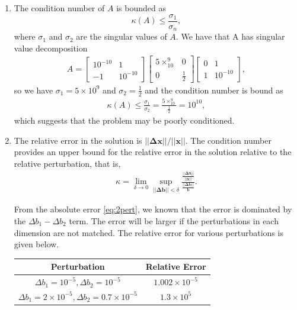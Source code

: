 \documentclass[10pt]{article}
\renewcommand\vec{\mathbf}
\begin{document}
\begin{enumerate}
\begin{enumerate}
      \item The condition number of \(A\) is bounded as \[\kappa(A) \leq \frac{\sigma_1}{\sigma_n},\] where \(\sigma_1\) and \(\sigma_2\) are the singular values of \(A\). We have that A has singular value decomposition \begin{align*}
          A = \begin{bmatrix}
            10^{-10} & 1 \\
            -1       & 10^{-10}
          \end{bmatrix} \begin{bmatrix}
            5\times_10^9 & 0 \\ 0 & \frac{1}{2}
          \end{bmatrix} \begin{bmatrix}
            0 & 1 \\ 1 & 10^{-10}
          \end{bmatrix},
      \end{align*} so we have \(\sigma_1 = 5\times 10^9\) and \(\sigma_2 = \frac{1}{2}\) and the condition number is bound as \begin{align*}
          \kappa (A) \leq \frac{\sigma_1}{\sigma_2} = \frac{5\times_10^9}{\frac{1}{2}} = 10^{10},
      \end{align*} which suggests that the problem may be poorly conditioned.

      \item The relative error in the solution is \(||\vec{\Delta x}|| / ||\vec{x}||\). The condition number provides an upper bound for the relative error in the solution relative to the relative perturbation, that is, \begin{align*}
          \kappa = \lim _{\delta \to 0} \sup_{||\vec{\Delta b}||<\delta}  \frac{\frac{||\vec{\Delta x}||}{||\vec{x}||}}{\frac{||\vec{\Delta b}||}{\vec{b}}}.
      \end{align*}
      
      From the absolute error \eqref{eq:2pert}, we known that the error is dominated by the \(\Delta b_1 - \Delta b_2\) term. The error will be larger if the perturbations in each dimension are not matched. The relative error for various perturbations is given below.

      \begin{center}
        \begin{tabular}{c|c}
          Perturbation & Relative Error \\
          \hline
          \(\Delta b_1 = 10^{-5}, \Delta b_2 = 10^{-5}\) & \(1.002\times 10^{-5}\) 
          \\ \hline
          \(\Delta b_1 = 2\times10^{-5}, \Delta b_2 = 0.7\times10^{-5}\) & \(1.3 \times 10^5\)
        \end{tabular}
      \end{center}


\end{enumerate}
\end{enumerate}
\end{document}

